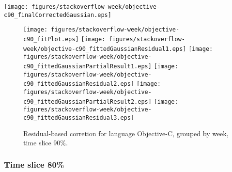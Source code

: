 \begin{center}
{\texttt{[image: figures/stackoverflow-week/objective-c90\_finalCorrectedGaussian.eps]}}
\end{center}

\FloatBarrier

\begin{figure}[t]
\centering
{}
{\texttt{[image: figures/stackoverflow-week/objective-c90\_fitPlot.eps]}}
{\texttt{[image: figures/stackoverflow-week/objective-c90\_fittedGaussianResidual1.eps]}}
{\texttt{[image: figures/stackoverflow-week/objective-c90\_fittedGaussianPartialResult1.eps]}}
{\texttt{[image: figures/stackoverflow-week/objective-c90\_fittedGaussianResidual2.eps]}}
{\texttt{[image: figures/stackoverflow-week/objective-c90\_fittedGaussianPartialResult2.eps]}}
{\texttt{[image: figures/stackoverflow-week/objective-c90\_fittedGaussianResidual3.eps]}}
\caption{Residual-based corretion for language Objective-C, grouped by week, time slice 90\%.}
\end{figure}


\FloatBarrier


\subsubsection{Time slice 80\%}

